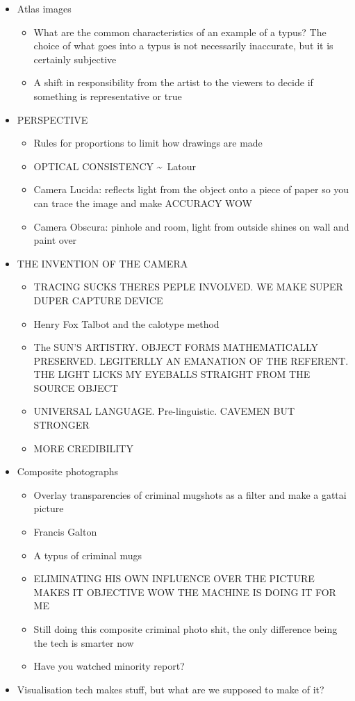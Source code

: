 \documentclass[a4paper]{article}
\begin{document}
\begin{itemize}
\begin{itemize}[label=$\circ$]
	\end{itemize}
	\newpage
	\item Atlas images
	\begin{itemize}[label=$\circ$]
		\item What are the common characteristics of an example of a typus? The choice of what goes into a typus is not necessarily inaccurate, but it is certainly subjective
		\item A shift in responsibility from the artist to the viewers to decide if something is representative or true
	\end{itemize}
	\item PERSPECTIVE
	\begin{itemize}[label=$\circ$]
		\item Rules for proportions to limit how drawings are made
		\item OPTICAL CONSISTENCY \textasciitilde\ Latour
		\item Camera Lucida: reflects light from the object onto a piece of paper so you can trace the image and make ACCURACY WOW
		\item Camera Obscura: pinhole and room, light from outside shines on wall and paint over
	\end{itemize}
	\item THE INVENTION OF THE CAMERA
	\begin{itemize}[label=$\circ$]
		\item TRACING SUCKS THERES PEPLE INVOLVED. WE MAKE SUPER DUPER CAPTURE DEVICE
		\item Henry Fox Talbot and the calotype method
		\item The SUN'S ARTISTRY. OBJECT FORMS MATHEMATICALLY PRESERVED. LEGITERLLY AN EMANATION OF THE REFERENT. THE LIGHT LICKS MY EYEBALLS STRAIGHT FROM THE SOURCE OBJECT
		\item UNIVERSAL LANGUAGE. Pre-linguistic. CAVEMEN BUT STRONGER
		\item MORE CREDIBILITY
	\end{itemize}
	\item Composite photographs
	\begin{itemize}[label=$\circ$]
		\item Overlay transparencies of criminal mugshots as a filter and make a gattai picture
		\item Francis Galton
		\item A typus of criminal mugs
		\item ELIMINATING HIS OWN INFLUENCE OVER THE PICTURE MAKES IT OBJECTIVE WOW THE MACHINE IS DOING IT FOR ME
		\item Still doing this composite criminal photo shit, the only difference being the tech is smarter now
		\item Have you watched minority report?
	\end{itemize}
	\item Visualisation tech makes stuff, but what are we supposed to make of it?
\end{itemize}
\end{document}
